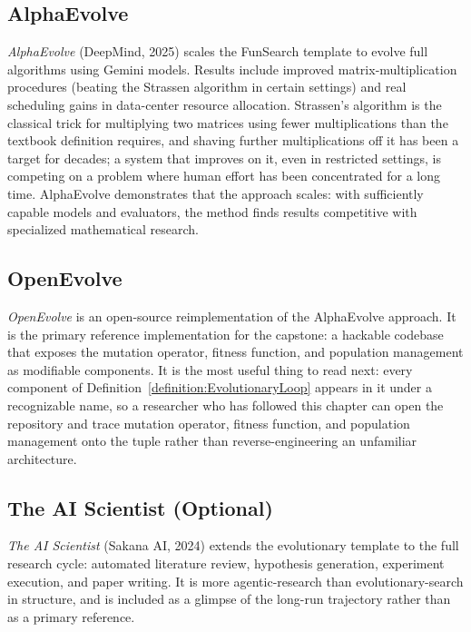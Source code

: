 \subsection{AlphaEvolve}

\emph{AlphaEvolve} (DeepMind, 2025) scales the FunSearch template to evolve full algorithms using Gemini models.
Results include improved matrix-multiplication procedures (beating the Strassen algorithm in certain settings) and real scheduling gains in data-center resource allocation.
Strassen's algorithm is the classical trick for multiplying two matrices using fewer multiplications than the textbook definition requires, and shaving further multiplications off it has been a target for decades; a system that improves on it, even in restricted settings, is competing on a problem where human effort has been concentrated for a long time.
AlphaEvolve demonstrates that the approach scales: with sufficiently capable models and evaluators, the method finds results competitive with specialized mathematical research.

\subsection{OpenEvolve}

\emph{OpenEvolve} is an open-source reimplementation of the AlphaEvolve approach.
It is the primary reference implementation for the capstone: a hackable codebase that exposes the mutation operator, fitness function, and population management as modifiable components.
It is the most useful thing to read next: every component of Definition~\ref{definition:EvolutionaryLoop} appears in it under a recognizable name, so a researcher who has followed this chapter can open the repository and trace mutation operator, fitness function, and population management onto the tuple rather than reverse-engineering an unfamiliar architecture.

\subsection{The AI Scientist (Optional)}

\emph{The AI Scientist} (Sakana AI, 2024) extends the evolutionary template to the full research cycle: automated literature review, hypothesis generation, experiment execution, and paper writing.
It is more agentic-research than evolutionary-search in structure, and is included as a glimpse of the long-run trajectory rather than as a primary reference.

